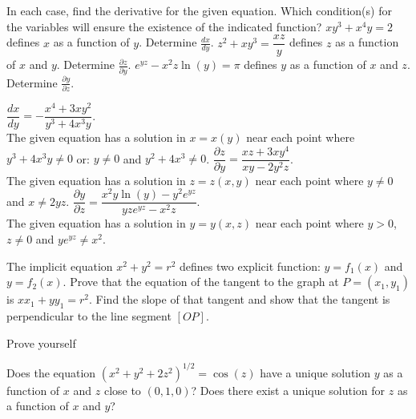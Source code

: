 \begin{Exercise}[difficulty = 3] In each case, find the  derivative for the given equation. Which condition(s) for the variables will ensure the existence of the indicated function?
    \Question $xy^3+x^4y=2$ defines $x$ as a function of $y$. Determine $\frac{dx}{dy}$.
    \Question $z^2 + xy^3 = \dfrac{xz}{y} $ defines $z$ as a function of $x$ and $y$. Determine  $\frac{\partial z}{\partial y}$.
    \Question $e^{yz} - x^2 z \ln (y) = \pi $ defines $y$ as a function of $x$ and $z$. Determine $\frac{\partial y}{\partial z}$.
\end{Exercise}

\begin{Answer}
    
    \Question $\dfrac{dx}{dy} = - \dfrac{x^4+3xy^2}{y^3+4x^3y}$. \\[0.2cm] 
    The given equation has a solution in $x=x(y)$ near each point where \\ $y^3+4x^3y\neq 0$ or: $y \neq 0$ and $y^2+4x^3 \neq 0$.
    \Question $\dfrac{\partial z}{\partial y} = \dfrac{xz+3xy^4}{xy-2y^2z}$. \\[0.2cm]
    The given equation has a solution in $z=z(x,y)$ near each point where $y\neq 0$ and $x \neq 2yz$.
    \Question $\dfrac{\partial y}{\partial z} = \dfrac{x^2 y \ln(y)-y^2e^{yz}}{yze^{yz}-x^2z }$. \\[0.2cm]
    The given equation has a solution in $y=y(x,z)$ near each point where $y > 0$, $z \neq 0$ and $ye^{yz} \neq x^2$.

\end{Answer}

\begin{Exercise}[difficulty = 2] The implicit equation $x^2+y^2=r^2$ defines two explicit function: $y=f_1(x)$ and $y=f_2(x)$.
    \Question Prove that the equation of the tangent to the graph at $P=(x_1,y_1)$ is $xx_1+yy_1=r^2$. 
    \Question Find the slope of that tangent and show that the tangent is perpendicular to the line segment $[OP]$.
\end{Exercise}

\begin{Answer}
    Prove yourself
\end{Answer}

\begin{Exercise}[difficulty = 3] Does the equation $(x^2+y^2+2z^2)^{1/2} = \cos(z)$ have a unique solution $y$ as a function of $x$ and $z$ close to $(0,1,0)$? Does there exist a unique solution for $z$ as a function of $x$ and $y$?
\end{Exercise}

